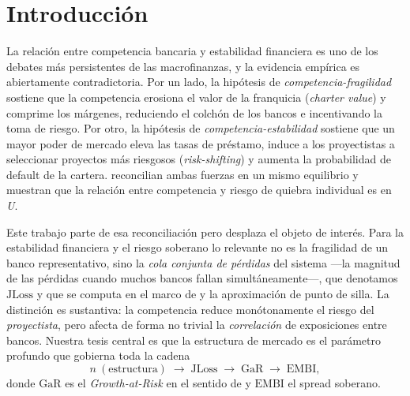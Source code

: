 \documentclass[11pt]{article}
\theoremstyle{plain}
\theoremstyle{definition}
\theoremstyle{remark}
\newcommand{\JLoss}{\mathrm{JLoss}}
\newcommand{\EMBI}{\mathrm{EMBI}}
\newcommand{\GaR}{\mathrm{GaR}}
\newcommand{\1}{\mathbf{1}}
\begin{document}
\begin{abstract}
\vspace{6pt}
\noindent\textbf{Palabras clave:} estabilidad financiera, competencia bancaria, riesgo sistémico, Growth-at-Risk, riesgo soberano, \textit{doom loop}.\\
\noindent\textbf{Clasificación JEL:} G21, G28, E44, H63, L13.
\end{abstract}

\section{Introducción}\label{sec:intro}

La relación entre competencia bancaria y estabilidad financiera es uno de los debates más persistentes de las macrofinanzas, y la evidencia empírica es abiertamente contradictoria. Por un lado, la hipótesis de \textit{competencia-fragilidad} \citep{Keeley1990} sostiene que la competencia erosiona el valor de la franquicia (\textit{charter value}) y comprime los márgenes, reduciendo el colchón de los bancos e incentivando la toma de riesgo. Por otro, la hipótesis de \textit{competencia-estabilidad} \citep{BoydDeNicolo2005} sostiene que un mayor poder de mercado eleva las tasas de préstamo, induce a los proyectistas a seleccionar proyectos más riesgosos (\textit{risk-shifting}) y aumenta la probabilidad de default de la cartera. \citet{MMR2010} reconcilian ambas fuerzas en un mismo equilibrio y muestran que la relación entre competencia y riesgo de quiebra individual es en \textit{U}.

Este trabajo parte de esa reconciliación pero desplaza el objeto de interés. Para la estabilidad financiera y el riesgo soberano lo relevante no es la fragilidad de un banco representativo, sino la \textit{cola conjunta de pérdidas} del sistema ---la magnitud de las pérdidas cuando muchos bancos fallan simultáneamente---, que denotamos $\JLoss$ y que se computa en el marco de \citet{Merton1974} y la aproximación de punto de silla. La distinción es sustantiva: la competencia reduce monótonamente el riesgo del \textit{proyectista}, pero afecta de forma no trivial la \textit{correlación} de exposiciones entre bancos. Nuestra tesis central es que la estructura de mercado es el parámetro profundo que gobierna toda la cadena
\begin{equation*}
n\ (\text{estructura}) \;\longrightarrow\; \JLoss \;\longrightarrow\; \GaR \;\longrightarrow\; \EMBI,
\end{equation*}
donde $\GaR$ es el \textit{Growth-at-Risk} en el sentido de \citet{ABG2019} y $\EMBI$ el spread soberano.
\end{document}
